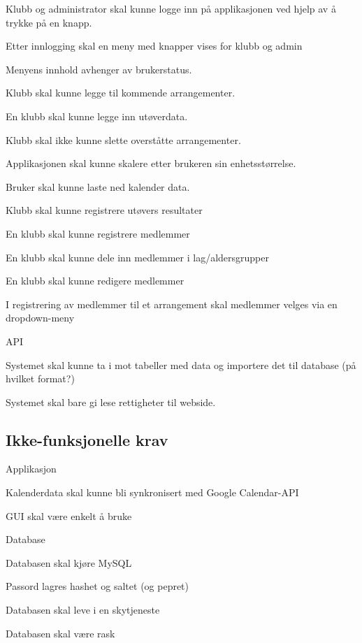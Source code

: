 \documentclass[norsk]{article}
\begin{document}
\begin{legal}
\begin{legal}
        \item Klubb og administrator skal kunne logge inn på  applikasjonen ved hjelp av å trykke på en knapp.
        \item Etter innlogging skal en meny med knapper vises for klubb og admin
        \begin{legal}
            \item Menyens innhold avhenger av brukerstatus.
        \end{legal}
        \item Klubb skal kunne legge til kommende arrangementer.
        \item En klubb skal kunne legge inn utøverdata.
        \item Klubb skal ikke kunne slette overståtte arrangementer.
        \item Applikasjonen skal kunne skalere etter brukeren sin enhetsstørrelse.
        \item Bruker skal kunne laste ned kalender data.
        \item Klubb skal kunne registrere utøvers resultater
        \item En klubb skal kunne registrere medlemmer
        \begin{legal}
            \item En klubb skal kunne dele inn medlemmer i lag/aldersgrupper
            \item En klubb skal kunne redigere medlemmer
        \end{legal}
        \item I registrering av medlemmer til et arrangement skal medlemmer velges via en dropdown-meny
    \end{legal}
    \item API
    \begin{legal}
        \item Systemet skal kunne ta i mot tabeller med data og importere det til database (på hvilket format?)
        \item Systemet skal bare gi lese rettigheter til webside.
    \end{legal}
    
    \subsection{Ikke-funksjonelle krav}
    \item Applikasjon
    \begin{legal}
        \item Kalenderdata skal kunne bli synkronisert med Google Calendar-API
        \item GUI skal være enkelt å bruke
    \end{legal}
    \item Database
    \begin{legal}
        \item Databasen skal kjøre MySQL
        \item Passord lagres hashet og saltet (og pepret)
        \item Databasen skal leve i en skytjeneste
        \item Databasen skal være rask
        

\end{legal}
\end{legal}
\end{document}
